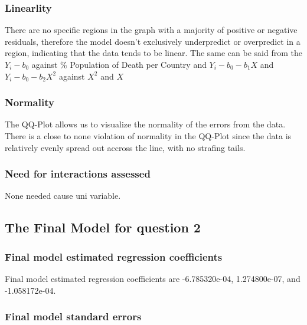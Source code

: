 \documentclass[
  12pt,
]{article}
\begin{document}
\hypertarget{linearlity}{%
\subsubsection{Linearlity}\label{linearlity}}

There are no specific regions in the graph with a majority of positive
or negative residuals, therefore the model doesn't exclusively
underpredict or overpredict in a region, indicating that the data tends
to be linear. The same can be said from the \(Y_i-b_0\) against \%
Population of Death per Country and \(Y_i - b_0 - b_1 X\) and
\(Y_i - b_0 - b_2 X^2\) against \(X^2\) and \(X\)

\hypertarget{normality}{%
\subsubsection{Normality}\label{normality}}

The QQ-Plot allows us to visualize the normality of the errors from the
data. There is a close to none violation of normality in the QQ-Plot
since the data is relatively evenly spread out accross the line, with no
strafing tails.

\hypertarget{need-for-interactions-assessed}{%
\subsubsection{Need for interactions
assessed}\label{need-for-interactions-assessed}}

None needed cause uni variable.

\hypertarget{the-final-model-for-question-2}{%
\subsection{The Final Model for question
2}\label{the-final-model-for-question-2}}

\hypertarget{final-model-estimated-regression-coefficients-1}{%
\subsubsection{Final model estimated regression
coefficients}\label{final-model-estimated-regression-coefficients-1}}

Final model estimated regression coefficients are -6.785320e-04,
1.274800e-07, and -1.058172e-04.

\hypertarget{final-model-standard-errors-1}{%
\subsubsection{Final model standard
errors}\label{final-model-standard-errors-1}}
\end{document}
